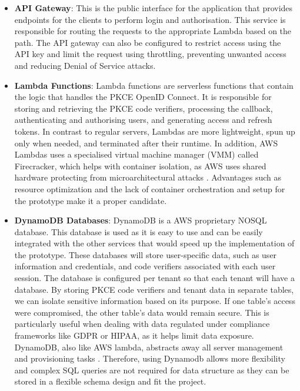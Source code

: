 \begin{itemize}
    \item \textbf{API Gateway}: This is the public interface for the application that provides endpoints for the clients to perform login and authorisation. This service is responsible for routing the requests to the appropriate Lambda based on the path. The API gateway can also be configured to restrict access using the API key and limit the request using throttling, preventing unwanted access and reducing Denial of Service attacks.
    
    \item \textbf{Lambda Functions}: Lambda functions are serverless functions that contain the logic that handles the PKCE OpenID Connect. It is responsible for storing and retrieving the PKCE code verifiers, processing the callback, authenticating and authorising users, and generating access and refresh tokens. In contrast to regular servers, Lambdas are more lightweight, spun up only when needed, and terminated after their runtime. In addition, AWS Lambdas uses a specialised virtual machine manager (VMM) called Firecracker, which helps with container isolation, as AWS uses shared hardware protecting from microarchitectural attacks \citep{lambda_vm_firecracker}. Advantages such as resource optimization and the lack of container orchestration and setup for the prototype make it a proper candidate.
    
    \item \textbf{DynamoDB Databases}: DynamoDB is a AWS proprietary NOSQL database. This database is used as it is easy to use and can be easily integrated with the other services that would speed up the implementation of the prototype. These databases will store user-specific data, such as user information and credentials, and code verifiers associated with each user session. The database is configured per tenant so that each tenant will have a database. By storing PKCE code verifiers and tenant data in separate tables, we can isolate sensitive information based on its purpose. If one table’s access were compromised, the other table’s data would remain secure. This is particularly useful when dealing with data regulated under compliance frameworks like GDPR or HIPAA, as it helps limit data exposure. DynamoDB, also like AWS lambda, abstracts away all server management and provisioning tasks \citep{dynamodb}. Therefore, using Dynamodb allows more flexibility and complex SQL queries are not required for data structure as they can be stored in a flexible schema design and fit the project.

\end{itemize}


